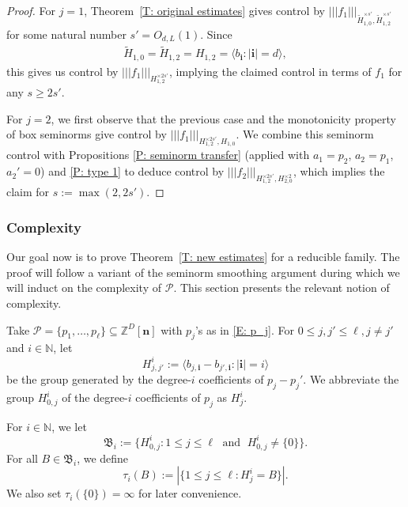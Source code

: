 \documentclass[11pt]{amsart}
\theoremstyle{definition}
\newcommand{\N}{{\mathbb N}}
\newcommand{\Z}{{\mathbb Z}}
\newcommand{\CP}{{\mathcal P}}
\newcommand{\FB}{{\mathfrak B}}
\newcommand{\bn}{{\mathbf{n}}}
\newcommand{\nnorm}[1]{\lvert\!|\!| #1|\!|\!\rvert}
\newcommand{\1}{{\mathbf{1}}}
\newcommand{\bi}{{\textbf{i}}}
\newcommand{\abs}[1]{\mathopen{}\left| #1\mathclose{}\right|}
\begin{document}
\begin{proof}
    For $j=1$, Theorem~\ref{T: original estimates} gives control by $\nnorm{f_1}_{\tilde H_{1,0}^{\times s'}, \tilde H_{1,2}^{\times s'}}$ for some natural number $s'=O_{d,L}(1)$. Since 
    \begin{align}\label{E: equality of subgroups H and tilde H}
        \tilde H_{1,0} = \tilde H_{1,2} = H_{1,2} = \langle b_{\bi}\colon \vert\bi\vert=d\rangle, 
    \end{align}
    this gives us control by $\nnorm{f_1}_{H_{1,2}^{\times 2s'}}$, implying the claimed control in terms of $f_1$ for any $s\geq 2s'$. 

    For $j=2$, we first observe that the previous case and the monotonicity property of box seminorms give control by $\nnorm{f_1}_{H_{1,2}^{\times 2s'}, H_{1,0}}$.
    We combine this seminorm control with Propositions \ref{P: seminorm transfer} 
    (applied with $a_1 = p_2$, $a_2 = p_1$, $a_2'=0$) and \ref{P: type 1}  to deduce control by $\nnorm{f_2}_{H_{1,2}^{\times 2s'}, H_{2,0}^{\times 2}}$, which implies the claim for $s:= \max(2,2s')$. %
\end{proof}

\subsubsection{Complexity}\label{SSS: complexity}
Our goal now is to prove Theorem~\ref{T: new estimates} for a reducible family. The proof will follow a variant of the seminorm smoothing argument during which we will induct on the complexity of $\CP$. This section presents the relevant notion of complexity.

{Take $\CP = \{p_1, \ldots, p_\ell\}\subseteq\Z^D[\bn]$ with $p_j$'s as in \eqref{E: p_j}.}
For $0\leq j,j'\leq \ell, j\neq j'$ and $i\in\N$, let 
$$H_{j,j'}^{i}:=\langle b_{j,\bi}-b_{j',\bi}\colon \vert\bi\vert=i\rangle$$
be the group generated by the degree-$i$ coefficients of $p_j-p_j'$.
We abbreviate the group $H_{0,j}^{i}$ of the degree-$i$ coefficients of $p_j$ as $H_{j}^{i}$.

For $i\in\N$, we let $$\FB_{i} := \{H_{0,j}^{i}\colon 1\leq j\leq \ell\; \textrm{ and }\; H_{0,j}^{i}\neq \{0\}\}.$$
For all $B\in \FB_{i}$,  we define $$\tau_{i}(B) := \abs{\{1\leq j\leq \ell\colon H_{j}^{i}=B\}}.$$ We also set $\tau_i(\{0\})=\infty$ for later convenience. 
\end{document}
